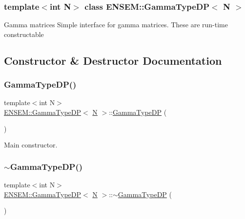 \subsubsection*{template$<$int N$>$\newline
class E\+N\+S\+E\+M\+::\+Gamma\+Type\+D\+P$<$ N $>$}

Gamma matrices Simple interface for gamma matrices. These are run-\/time constructable 

\subsection{Constructor \& Destructor Documentation}
\mbox{\label{classENSEM_1_1GammaTypeDP_a1833bb262c5e172a0463d853c76c1d18}} 
\subsubsection{\texorpdfstring{GammaTypeDP()}{GammaTypeDP()}\hspace{0.1cm}{\footnotesize\ttfamily [1/6]}}
{\footnotesize\ttfamily template$<$int N$>$ \\
\mbox{\hyperlink{classENSEM_1_1GammaTypeDP}{E\+N\+S\+E\+M\+::\+Gamma\+Type\+DP}}$<$ \mbox{\hyperlink{adat__devel_2lib_2hadron_2operator__name__util_8cc_a7722c8ecbb62d99aee7ce68b1752f337}{N}} $>$\+::\mbox{\hyperlink{classENSEM_1_1GammaTypeDP}{Gamma\+Type\+DP}} (\begin{DoxyParamCaption}{ }\end{DoxyParamCaption})\hspace{0.3cm}{\ttfamily [inline]}}



Main constructor. 

\mbox{\label{classENSEM_1_1GammaTypeDP_ad0e6f055b87687dac9b7b95e6ec808b0}} 
\subsubsection{\texorpdfstring{$\sim$GammaTypeDP()}{~GammaTypeDP()}\hspace{0.1cm}{\footnotesize\ttfamily [1/3]}}
{\footnotesize\ttfamily template$<$int N$>$ \\
\mbox{\hyperlink{classENSEM_1_1GammaTypeDP}{E\+N\+S\+E\+M\+::\+Gamma\+Type\+DP}}$<$ \mbox{\hyperlink{adat__devel_2lib_2hadron_2operator__name__util_8cc_a7722c8ecbb62d99aee7ce68b1752f337}{N}} $>$\+::$\sim$\mbox{\hyperlink{classENSEM_1_1GammaTypeDP}{Gamma\+Type\+DP}} (\begin{DoxyParamCaption}{ }\end{DoxyParamCaption})\hspace{0.3cm}{\ttfamily [inline]}}




